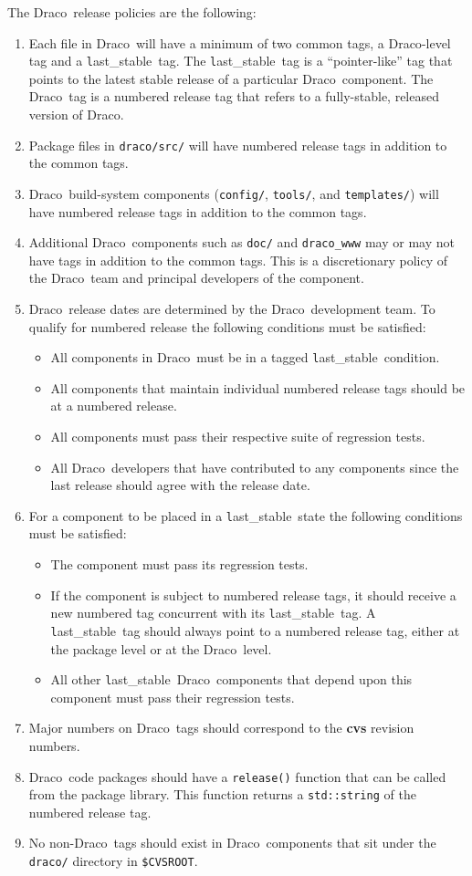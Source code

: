 \documentclass[11pt]{nmemo}
\newcommand{\draco}{{\normalfont\normalsize\textsf Draco}}
\newcommand{\stable}{{\normalfont\normalsize\texttt last\_stable}}
\begin{document}
The \draco\ release policies are the following:
\begin{enumerate}
\item Each file in \draco\ will have a minimum of two common tags, a
  \draco-level tag and a \stable\ tag.  The \stable\ tag is a
  ``pointer-like'' tag that points to the latest stable release of a
  particular \draco\ component.  The \draco\ tag is a numbered release
  tag that refers to a fully-stable, released version of \draco.
\item Package files in \texttt{draco/src/} will have numbered release
  tags in addition to the common tags.
\item \draco\ build-system components (\texttt{config/},
  \texttt{tools/}, and \texttt{templates/}) will have numbered release
  tags in addition to the common tags.
\item Additional \draco\ components such as \texttt{doc/} and
  \texttt{draco\_www} may or may not have tags in addition to the
  common tags.  This is a discretionary policy of the \draco\ team and 
  principal developers of the component.
\item \draco\ release dates are determined by the \draco\ development
  team.  To qualify for numbered release the following conditions must 
  be satisfied:
  \begin{itemize}
  \item All components in \draco\ must be in a tagged \stable\
    condition.
  \item All components that maintain individual numbered release tags
    should be at a numbered release.
  \item All components must pass their respective suite of
    regression tests.
  \item All \draco\ developers that have contributed to any components
    since the last release should agree with the release date.
  \end{itemize}
\item For a component to be placed in a \stable\ state the
  following conditions must be satisfied:
  \begin{itemize}
  \item The component must pass its regression tests.
  \item If the component is subject to numbered release tags, it
    should receive a new numbered tag concurrent with its \stable\ 
    tag.  A \stable\ tag should always point to a numbered release
    tag, either at the package level or at the \draco\ level.
  \item All other \stable\ \draco\ components that depend upon this
    component must pass their regression tests.
  \end{itemize}
\item Major numbers on \draco\ tags should correspond to the {\bf cvs} 
  revision numbers.
\item \draco\ code packages should have a \texttt{release()} function
  that can be called from the package library.  This function returns
  a \texttt{std::string} of the numbered release tag.
\item No non-\draco\ tags should exist in \draco\ components that sit
  under the \texttt{draco/} directory in \texttt{\$CVSROOT}.
\end{enumerate}
\end{document}
